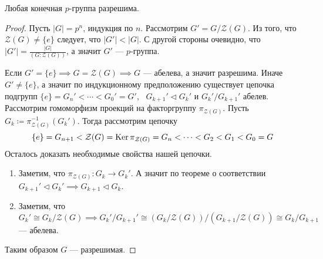 \documentclass[../main.tex]{subfiles}
\begin{document}
\begin{corollary*}
  Любая конечная $p$-группа разрешима.
\end{corollary*}
\begin{proof}
  Пусть $|G| = p^n$, индукция по $n$. Рассмотрим $G' = G / \mathcal{Z}(G)$. Из того, что $\mathcal{Z}(G) \neq \{e\}$ следует, что $|G'| < |G|$. С другой стороны очевидно,  что $|G'| = \frac{|G|}{(G : \mathcal{Z}(G))}$, а значит $G'$ --- $p$-группа.

  Если $G' = \{e\} \implies G = \mathcal{Z}(G) \implies G$ --- абелева, а значит разрешима. Иначе $G' \neq \{e\}$, а значит по индукционному предположению существует цепочка подгрупп $\{e\} = G_n' < \dotsb < G_0' = G'$, \, $G_{k + 1}' \triangleleft G_k'$ и $G_k' / G_{k + 1}'$ абелев. Рассмотрим гомоморфизм проекций на факторгруппу $\pi_{\mathcal{Z}(G)}$. Пусть $G_k \coloneqq \pi_{\mathcal{Z}(G)}^{-1}(G_k')$. Тогда рассмотрим цепочку
  \begin{equation*}
    \{e\} = G_{n + 1} < \mathcal{Z}(G) = \operatorname{Ker} \pi_{\mathcal{Z}(G)} = G_n < \dotsb < G_2 < G_1 < G_0 = G
  \end{equation*}
  Осталось доказать необходимые свойства нашей цепочки.
  \begin{enumerate}
    \item Заметим, что $\pi_{\mathcal{Z}(G)}\colon G_k \longrightarrow G_k'$. А значит по теореме о соответствии $G_{k + 1}' \triangleleft G_k' \implies G_{k + 1} \triangleleft G_k$.
    \item Заметим, что $G_k' \cong G_k / \mathcal{Z}(G) \implies G_k' / G_{k + 1}' \cong (G_k / \mathcal{Z}(G)) / (G_{k + 1} / \mathcal{Z}(G)) \cong G_k/G_{k + 1}$ --- абелева.
  \end{enumerate}
  Таким образом $G$ --- разрешимая.
\end{proof}
\end{document}

